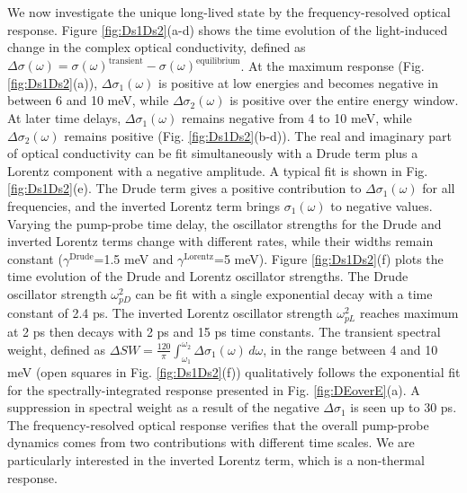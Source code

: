 \documentclass[%
 reprint,
superscriptaddress,
 amsmath,amssymb,
 aps,
]{revtex4-2}
\begin{document}
We now investigate the unique long-lived state by the frequency-resolved optical response. Figure \ref{fig:Ds1Ds2}(a-d) shows the time evolution of the light-induced change in the complex optical conductivity, defined as $\Delta\sigma(\omega) = \sigma(\omega)^{\text{transient}} - \sigma(\omega)^{\text{equilibrium}}$. At the maximum response (Fig. \ref{fig:Ds1Ds2}(a)), $\Delta\sigma_1(\omega)$ is positive at low energies and becomes negative in between 6 and 10 meV, while $\Delta\sigma_2(\omega)$ is positive over the entire energy window. At later time delays, $\Delta\sigma_1(\omega)$ remains negative from 4 to 10 meV, while $\Delta\sigma_2(\omega)$ remains positive (Fig. \ref{fig:Ds1Ds2}(b-d)). The real and imaginary part of optical conductivity can be fit simultaneously with a Drude term plus a Lorentz component with a negative amplitude. A typical fit is shown in Fig. \ref{fig:Ds1Ds2}(e). The Drude term gives a positive contribution to $\Delta\sigma_1(\omega)$ for all frequencies, and the inverted Lorentz term brings $\sigma_1(\omega)$ to negative values. Varying the pump-probe time delay, the oscillator strengths for the Drude and inverted Lorentz terms change with different rates, while their widths remain constant ($\gamma^{\text{Drude}}$=1.5 meV and $\gamma^{\text{Lorentz}}$=5 meV). Figure \ref{fig:Ds1Ds2}(f) plots the time evolution of the Drude and Lorentz oscillator strengths. The Drude oscillator strength $\omega_{pD}^2$ can be fit with a single exponential decay with a time constant of 2.4 ps. The inverted Lorentz oscillator strength $\omega_{pL}^2$ reaches maximum at 2 ps then decays with 2 ps and 15 ps time constants. The transient spectral weight, defined as $\Delta SW=\frac{120}{\pi}\int_{\omega_1}^{\omega_2}\Delta\sigma_1(\omega) \,d\omega$, in the range between 4 and 10 meV (open squares in Fig. \ref{fig:Ds1Ds2}(f)) qualitatively follows the exponential fit for the spectrally-integrated response presented in Fig. \ref{fig:DEoverE}(a). A suppression in spectral weight as a result of the negative $\Delta\sigma_1$ is seen up to 30 ps. The frequency-resolved optical response verifies that the overall pump-probe dynamics comes from two contributions with different time scales. We are particularly interested in the inverted Lorentz term, which is a non-thermal response. 
\end{document}
